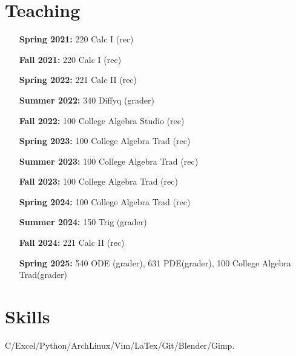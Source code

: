 \documentclass{article}
\begin{document}
\section*{Teaching}  
\begin{itemize}[
    labelwidth=3cm,
    labelsep=5mm,
    leftmargin=!,
    align=left ]
\item[\bfseries{Spring 2021:}] 220 Calc I (rec)
\item[\bfseries{Fall 2021:}] 220 Calc I (rec)
\item[\bfseries{Spring 2022:}] 221 Calc II (rec)
\item[\bfseries{Summer 2022:}] 340 Diffyq (grader)
\item[\bfseries{Fall 2022:}] 100 College Algebra Studio (rec)
\item[\bfseries{Spring 2023:}] 100 College Algebra Trad (rec)
\item[\bfseries{Summer 2023:}] 100 College Algebra Trad (rec)
\item[\bfseries{Fall 2023:}] 100 College Algebra Trad (rec)
\item[\bfseries{Spring 2024:}] 100 College Algebra Trad (rec)
\item[\bfseries{Summer 2024:}] 150 Trig (grader)
\item[\bfseries{Fall 2024:}] 221 Calc II (rec)
\item[\bfseries{Spring 2025:}] 540 ODE (grader), 631 PDE(grader), 100 College Algebra Trad(grader)
\end{itemize}


\section*{Skills}
C/Excel/Python/ArchLinux/Vim/LaTex/Git/Blender/Gimp. \\
\end{document}
